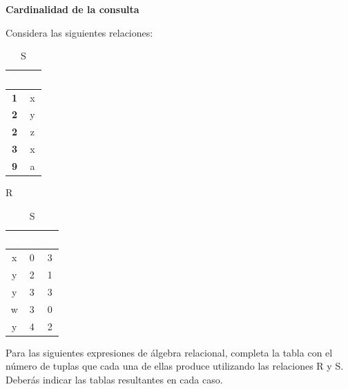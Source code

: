 \begin{center}
    \textbf{Cardinalidad de la consulta}
\end{center}

Considera las siguientes relaciones:
\begin{table}[H]
    \centering
    \setlength{\tabcolsep}{10pt} %
    \begin{minipage}{0.4\textwidth}
        \centering
        \begin{tabular}{|c|c|}
        \hline
        \rowcolor{blue!50}
        \textcolor{white}{\textbf{A}} & \textcolor{white}{\textbf{B}} \\ \hline
        \textbf{1} & x \\ \hline
        \textbf{2} & y \\ \hline
        \textbf{2} & z \\ \hline
        \textbf{3} & x \\ \hline
        \textbf{9} & a \\ \hline
        \end{tabular}
        \caption{R}
    \end{minipage}
    \hspace{2cm} %
    \begin{minipage}{0.4\textwidth}
        \centering
        \begin{tabular}{|c|c|c|}
        \hline
        \rowcolor{blue!50}
        \textcolor{white}{\textbf{B}} & \textcolor{white}{\textbf{C}} & \textcolor{white}{\textbf{D}} \\ \hline
        x & 0 & 3 \\ \hline
        y & 2 & 1 \\ \hline
        y & 3 & 3 \\ \hline
        w & 3 & 0 \\ \hline
        y & 4 & 2 \\ \hline
        \end{tabular}
        \caption{S}
    \end{minipage}
\end{table}

Para las siguientes expresiones de álgebra relacional, completa la tabla con el número de tuplas que cada una de ellas
produce utilizando las relaciones R y S. Deberás indicar las tablas resultantes en cada caso.


